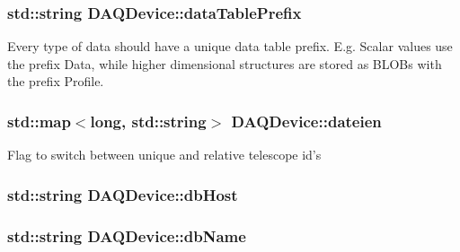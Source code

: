 \hypertarget{classDAQDevice_ac2ae1cde05bf5d13d18e213c94c5dadc}{
\subsubsection[{data\-Table\-Prefix}]{\setlength{\rightskip}{0pt plus 5cm}std\-::string D\-A\-Q\-Device\-::data\-Table\-Prefix\hspace{0.3cm}{\ttfamily [protected]}}}\label{classDAQDevice_ac2ae1cde05bf5d13d18e213c94c5dadc}
Every type of data should have a unique data table prefix. E.\-g. Scalar values use the prefix Data, while higher dimensional structures are stored as B\-L\-O\-Bs with the prefix Profile. \hypertarget{classDAQDevice_a962745a4a4f20898c918d59fabf05e2a}{
\subsubsection[{dateien}]{\setlength{\rightskip}{0pt plus 5cm}std\-::map$<$long, std\-::string$>$ D\-A\-Q\-Device\-::dateien\hspace{0.3cm}{\ttfamily [private]}}}\label{classDAQDevice_a962745a4a4f20898c918d59fabf05e2a}
Flag to switch between unique and relative telescope id's \hypertarget{classDAQDevice_ad85b8bb5afbe0a9c3cd75e7ee9ef83ee}{
\subsubsection[{db\-Host}]{\setlength{\rightskip}{0pt plus 5cm}std\-::string D\-A\-Q\-Device\-::db\-Host\hspace{0.3cm}{\ttfamily [protected]}}}\label{classDAQDevice_ad85b8bb5afbe0a9c3cd75e7ee9ef83ee}
\hypertarget{classDAQDevice_afb3d256eedb538510939b8c40e26a968}{
\subsubsection[{db\-Name}]{\setlength{\rightskip}{0pt plus 5cm}std\-::string D\-A\-Q\-Device\-::db\-Name\hspace{0.3cm}{\ttfamily [protected]}}}\label{classDAQDevice_afb3d256eedb538510939b8c40e26a968}
